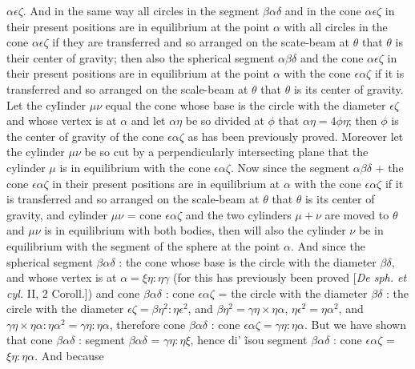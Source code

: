 \documentclass[12pt]{article}
\begin{document}
$\alpha\epsilon\zeta$. And in the same way all circles in the segment
$\beta\alpha\delta$ and in the cone $\alpha\epsilon\zeta$ in their
present positions are in equilibrium at the point $\alpha$ with all
circles in the cone $\alpha\epsilon\zeta$ if they are transferred and
so arranged on the scate-beam at $\theta$ that $\theta$ is their
center of gravity; then also the spherical segment $\alpha\beta\delta$
and the cone $\alpha\epsilon\zeta$ in their present positions are in
equilibrium at the point $\alpha$ with the cone $\epsilon\alpha\zeta$
if it is transferred and so arranged on the scale-beam at $\theta$
that $\theta$ is its center of gravity. Let the cyIinder $\mu\nu$
equal the cone whose base is the circle with the diameter
$\epsilon\zeta$ and whose vertex is at $\alpha$ and let $\alpha\eta$
be so divided at $\phi$ that $\alpha\eta = 4\phi\eta$; then $\phi$ is
the center of gravity of the cone $\epsilon\alpha\zeta$ as has been
previously proved.  Moreover let the cylinder $\mu\nu$ be so cut by a
perpendicularly intersecting plane that the cylinder $\mu$ is in
equilibrium with the cone $\epsilon\alpha\zeta$. Now since the segment
$\alpha\beta\delta$ + the cone $\epsilon\alpha\zeta$ in their present
positions are in equilibrium at $\alpha$ with the cone
$\epsilon\alpha\zeta$ if it is transferred and so arranged on the
scale-beam at $\theta$ that $\theta$ is its center of gravity, and
cylinder $\mu\nu$ = cone $\epsilon\alpha\zeta$ and the two cylinders
$\mu + \nu$ are moved to $\theta$ and $\mu\nu$ is in equilibrium with
both bodies, then will also the cylinder $\nu$ be in equilibrium with
the segment of the sphere at the point $\alpha$.  And since the
spherical segment $\beta\alpha\delta$ : the cone whose base is the
circle with the diameter $\beta\delta$, and whose vertex is at $\alpha
= \xi\eta : \eta\gamma$ (for this has previously been proved [\emph{De
sph. et cyl.} II, 2 Coroll.])  and cone $\beta\alpha\delta$ : cone
$\epsilon\alpha\zeta$ = the circle with the diameter $\beta\delta$ :
the circle with the diameter $\epsilon\zeta = \beta\eta^2 :
\eta\epsilon^2$, and $\beta\eta^2 = \gamma\eta \times \eta\alpha$,
$\eta\epsilon^2 = \eta\alpha^2$, and $\gamma\eta \times \eta\alpha :
\eta\alpha^2 = \gamma\eta : \eta\alpha$, therefore cone
$\beta\alpha\delta$ : cone $\epsilon\alpha\zeta = \gamma\eta :
\eta\alpha$.  But we have shown that cone $\beta\alpha\delta$ :
segment $\beta\alpha\delta$ = $\gamma\eta : \eta\xi$, hence
{di' \~isou} segment $\beta\alpha\delta$ : cone
$\epsilon\alpha\zeta$ = $\xi\eta : \eta\alpha$.  And because
\end{document}

